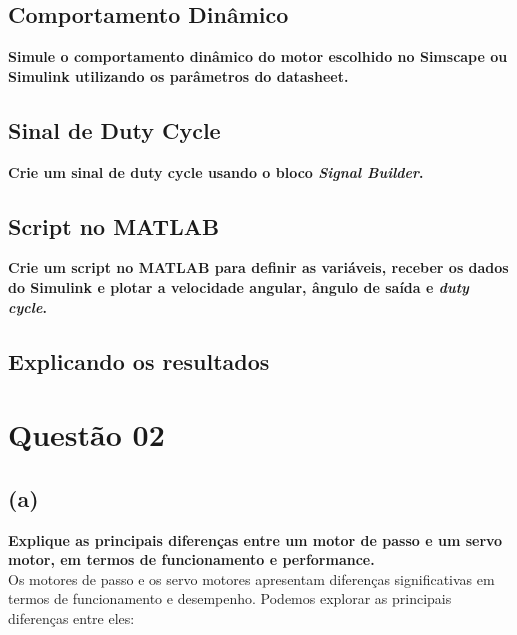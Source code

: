 \documentclass[a4paper, 12pt]{article}
\begin{document}
\newpage
\subsection{Comportamento Dinâmico}
\textbf{Simule o comportamento dinâmico do motor escolhido no Simscape ou Simulink utilizando os parâmetros do datasheet.} \\
 
\newpage
\subsection{Sinal de Duty Cycle}
\textbf{Crie um sinal de duty cycle usando o bloco \textit{Signal Builder}.}\\


\newpage
\subsection{Script no MATLAB}
\textbf{Crie um script no MATLAB para definir as variáveis, receber os dados do Simulink e plotar a
velocidade angular, ângulo de saída e \textit{duty cycle}.}

\newpage
\subsection{Explicando os resultados}


\newpage
\section{Questão 02}
\subsection{(a) }
\textbf{Explique as principais diferenças entre um motor de passo e um servo motor, em termos de
funcionamento e performance.}\\

Os motores de passo e os servo motores apresentam diferenças significativas em termos de funcionamento e desempenho. Podemos explorar as principais diferenças entre eles:\\
\end{document}
